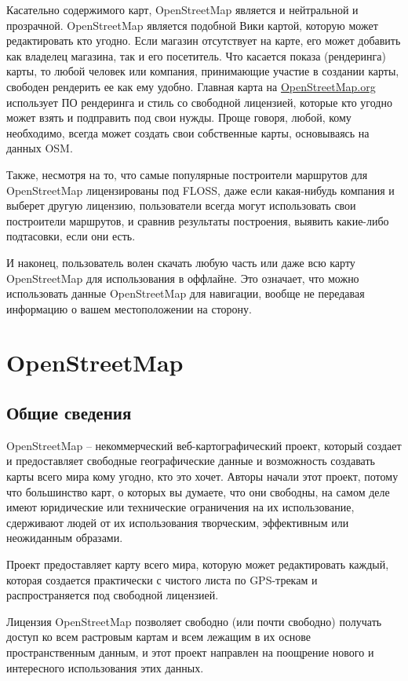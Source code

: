 Касательно содержимого карт, OpenStreetMap является и нейтральной и 
прозрачной. OpenStreetMap является подобной Вики картой, которую может 
редактировать кто угодно. Если магазин отсутствует на карте, его может 
добавить как владелец магазина, так и его посетитель. Что касается показа 
(рендеринга) карты, то любой человек или компания, принимающие участие в 
создании карты, свободен рендерить ее как ему удобно. Главная карта на 
\url{OpenStreetMap.org} использует ПО рендеринга и стиль со свободной 
лицензией, которые кто угодно может взять и подправить под свои нужды. 
Проще говоря, любой, кому необходимо, всегда может создать свои собственные 
карты, основываясь на данных OSM.

Также, несмотря на то, что самые популярные построители маршрутов для 
OpenStreetMap лицензированы под FLOSS\cite{floss}, даже если какая-нибудь 
компания и выберет другую лицензию, пользователи всегда могут использовать 
свои построители маршрутов, и сравнив результаты построения, выявить 
какие-либо подтасовки, если они есть.

И наконец, пользователь волен скачать любую часть или даже всю карту 
OpenStreetMap для использования в оффлайне. Это означает, что можно 
использовать данные OpenStreetMap для навигации, вообще не передавая 
информацию о вашем местоположении на сторону.\cite{habrahabr01}

\section{OpenStreetMap}
\subsection{Общие сведения}
OpenStreetMap -- некоммерческий веб-картографический проект, который создает и 
предоставляет свободные географические данные и возможность создавать карты 
всего мира кому угодно, кто это хочет. Авторы начали этот проект, потому что 
большинство карт, о которых вы думаете, что они свободны, на самом деле имеют 
юридические или технические ограничения на их использование, сдерживают людей 
от их использования творческим, эффективным или неожиданным образами. 

Проект предоставляет карту всего мира, которую может редактировать каждый, 
которая создается практически с чистого листа по GPS-трекам и распространяется 
под свободной лицензией.

Лицензия OpenStreetMap позволяет свободно (или почти свободно) получать доступ 
ко всем растровым картам и всем лежащим в их основе пространственным 
данным, и этот проект направлен на поощрение нового и интересного 
использования этих данных.\cite{osmwiki}


